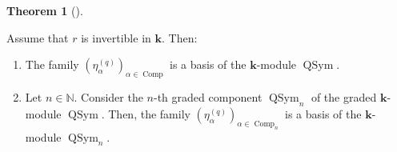 \documentclass[numbers=enddot,12pt,final,onecolumn,notitlepage]{scrartcl}%
\theoremstyle{definition}
\newtheorem{theo}{Theorem}[section]
\newenvironment{theorem}[1][]
{\begin{theo}[#1]\begin{leftbar}}
{\end{leftbar}\end{theo}}
\begin{document}
\begin{theorem}
\label{thm.eta.basis}Assume that $r$ is invertible in $\mathbf{k}$. Then:

\begin{enumerate}
\item[\textbf{(a)}] The family $\left(  \eta_{\alpha}^{\left(  q\right)
}\right)  _{\alpha\in\operatorname*{Comp}}$ is a basis of the $\mathbf{k}%
$-module $\operatorname*{QSym}$.

\item[\textbf{(b)}] Let $n\in\mathbb{N}$. Consider the $n$-th graded component
$\operatorname*{QSym}\nolimits_{n}$ of the graded $\mathbf{k}$-module
$\operatorname*{QSym}$. Then, the family $\left(  \eta_{\alpha}^{\left(
q\right)  }\right)  _{\alpha\in\operatorname*{Comp}\nolimits_{n}}$ is a basis
of the $\mathbf{k}$-module $\operatorname*{QSym}\nolimits_{n}$.
\end{enumerate}
\end{theorem}
\end{document}
